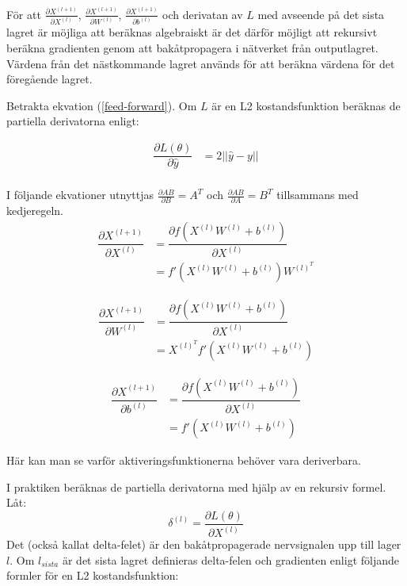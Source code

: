 \documentclass[a4paper,11pt,twoside]{article}
\newcommand*{\pd}[2]{\ensuremath{\dfrac{\partial #1}{\partial #2}}}
\newcommand*{\inpd}[2]{\ensuremath{\frac{\partial #1}{\partial #2}}}
\begin{document}
För att $\inpd{X^{(l+1)}}{X^{(l)}}$, $\inpd{X^{(l+1)}}{W^{(l)}}$, $\inpd{X^{(l+1)}}{b^{(l)}}$ och derivatan av $L$ med avseende på det sista lagret är möjliga att beräknas algebraiskt är det därför möjligt att rekursivt beräkna gradienten genom att bakåtpropagera i nätverket från outputlagret. Värdena från det nästkommande lagret används för att beräkna värdena för det föregående lagret. \cite{convmath}

Betrakta ekvation (\ref{feed-forward}). Om $L$ är en L2 kostandsfunktion beräknas de partiella derivatorna enligt:  \cite{cs231n} \cite{convmath} 

\begin{equation}
\begin{split}
\pd{L(\theta)}{\hat{y}} 
				& = 2 ||\hat{y}-y|| \\
\end{split}
\end{equation}

I följande ekvationer utnyttjas $\inpd{AB}{B} = A^T$ och $\inpd{AB}{A} = B^T$ tillsammans med kedjeregeln.
\begin{equation}
\begin{split}
\pd{X^{(l+1)}}{X^{(l)}} 
				& = \pd{f(X^{(l)}W^{(l)} +b^{(l)})}{X^{(l)}}  \\
				& = f'(X^{(l)}W^{(l)}+b^{(l)})W^{(l)^T}
\end{split}
\end{equation}

\begin{equation}
\begin{split}
\pd{X^{(l+1)}}{W^{(l)}} 
				& = \pd{f(X^{(l)}W^{(l)} +b^{(l)})}{X^{(l)}}  \\
				& = X^{(l)^T}f'(X^{(l)}W^{(l)}+b^{(l)})
\end{split}
\end{equation}

\begin{equation}
\begin{split}
\pd{X^{(l+1)}}{b^{(l)}} 
				& = \pd{f(X^{(l)}W^{(l)} +b^{(l)})}{X^{(l)}}  \\
				& = f'(X^{(l)}W^{(l)}+b^{(l)})
\end{split}
\end{equation}

Här kan man se varför aktiveringsfunktionerna behöver vara deriverbara.

I praktiken beräknas de partiella derivatorna med hjälp av en rekursiv formel. Låt: \cite{cs231n} \cite{wikiStanford} \cite{convmath}
\begin{equation}
\delta^{(l)} = \pd{L(\theta)}{X^{(l)}}
\end{equation}
Det (också kallat delta-felet) är den bakåtpropagerade nervsignalen upp till lager $l$. Om $l_{sista}$ är det sista lagret definieras delta-felen och gradienten enligt följande formler för en L2 kostandsfunktion: \cite{cs231n} \cite{wikiStanford} \cite{convmath}
\end{document}
